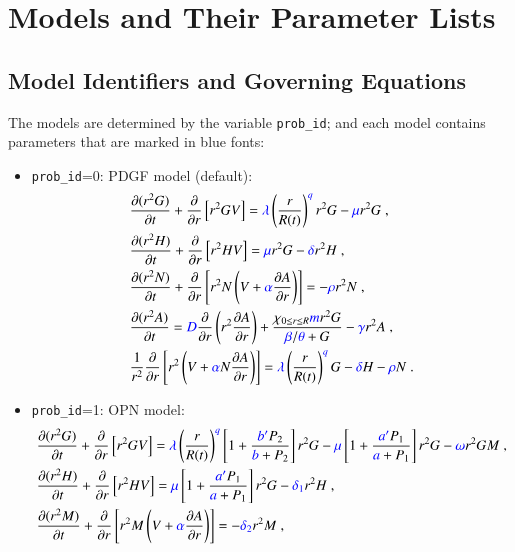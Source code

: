 \documentclass{amsproc}
\theoremstyle{definition}
\theoremstyle{remark}
\numberwithin{equation}{section}
\numberwithin{figure}{section}
\newcommand{\po}[1]{\frac{\partial}{\partial{#1}}}
\newcommand{\pp}[2]{\frac{\partial {#1}}{\partial {#2}}}
\begin{document}
\section{Models and Their Parameter Lists}
\label{sec:model}

\subsection{Model Identifiers and Governing Equations}
The models are determined by the variable \texttt{prob\_id}; and each model contains parameters that are marked in {\color{blue} blue} fonts:
\begin{itemize}
\item \texttt{prob\_id}=0: PDGF model (default):
  \begin{align*}
    &\pp{(r^2G)}{t} + \po{r}\left[r^2 G V\right] = {\color{blue}\lambda}\left(\frac{r}{R(t)}\right)^{\color{blue}q} r^2G - {\color{blue}\mu} r^2G\;, \\
    &\pp{(r^2H)}{t} + \po{r}\left[r^2H V\right] = {\color{blue}\mu} r^2G - {\color{blue}\delta} r^2H\;, \\
    &\pp{(r^2N)}{t} + \po{r}\left[r^2N\left(V+{\color{blue}\alpha}\pp{A}{r}\right)\right] = - {\color{blue}\rho} r^2N\;,\\
    &\pp{(r^2A)}{t} = {\color{blue}D}\po{r}\left(r^2\pp{A}{r}\right) + \frac{\chi_{0\le r\le R}{\color{blue}m}r^2G}{{\color{blue}\beta}/{\color{blue}\theta}+G} - {\color{blue}\gamma} r^2A\;,\\
    &\frac{1}{r^2}\po{r}\left[r^2\left(V+{\color{blue}\alpha} N\pp{A}{r}\right)\right] = {\color{blue}\lambda}\left(\frac{r}{R(t)}\right)^{\color{blue}q} G - {\color{blue}\delta} H - {\color{blue}\rho} N\;.
  \end{align*}
\item \texttt{prob\_id}=1: OPN model:
  \begin{align*}
    &\pp{(r^2G)}{t} + \po{r}\left[r^2 G V\right] = {\color{blue}\lambda}\left(\frac{r}{R(t)}\right)^{\color{blue}q}\left[1+\frac{{\color{blue}b'}P_2}{{\color{blue}b}+P_2}\right]r^2G - {\color{blue}\mu}\left[1+\frac{{\color{blue}a'}P_1}{{\color{blue}a}+P_1}\right]r^2G - {\color{blue} \omega}r^2GM\;, \\
    &\pp{(r^2H)}{t} + \po{r}\left[r^2H V\right] = {\color{blue}\mu}\left[1+\frac{{\color{blue}a'}P_1}{{\color{blue}a}+P_1}\right]r^2G - {\color{blue}\delta_1} r^2H\;, \\
    &\pp{(r^2M)}{t} + \po{r}\left[r^2M\left(V+{\color{blue}\alpha}\pp{A}{r}\right)\right] = - {\color{blue}\delta_2} r^2M\;,\\

\end{align*}
\end{itemize}
\end{document}
